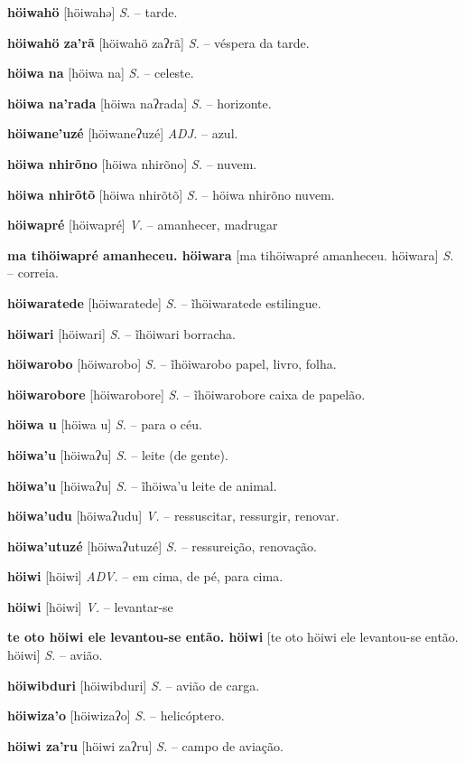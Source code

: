 \textbf{höiwahö} [höiwahə] \textit{S.} -- tarde.

\textbf{höiwahö za'rã} [höiwahö zaʔrã] \textit{S.} -- véspera da tarde.

\textbf{höiwa na} [höiwa na] \textit{S.} -- celeste.

\textbf{höiwa na'rada} [höiwa naʔrada] \textit{S.} -- horizonte.

\textbf{höiwane'uzé} [höiwaneʔuzé] \textit{ADJ.} -- azul.

\textbf{höiwa nhirõno} [höiwa nhirõno] \textit{S.} -- nuvem.

\textbf{höiwa nhirõtõ} [höiwa nhirõtõ] \textit{S.} -- höiwa nhirõno nuvem.

\textbf{höiwapré} [höiwapré] \textit{V.} -- amanhecer, madrugar

\textbf{ma tihöiwapré amanheceu. höiwara} [ma tihöiwapré amanheceu. höiwara] \textit{S.} -- correia.

\textbf{höiwaratede} [höiwaratede] \textit{S.} -- ĩhöiwaratede estilingue.

\textbf{höiwari} [höiwari] \textit{S.} -- ĩhöiwari borracha.

\textbf{höiwarobo} [höiwarobo] \textit{S.} -- ĩhöiwarobo papel, livro, folha.

\textbf{höiwarobore} [höiwarobore] \textit{S.} -- ĩhöiwarobore caixa de papelão.

\textbf{höiwa u} [höiwa u] \textit{S.} -- para o céu.

\textbf{höiwa'u} [höiwaʔu] \textit{S.} -- leite (de gente).

\textbf{höiwa'u} [höiwaʔu] \textit{S.} -- ĩhöiwa'u leite de animal.

\textbf{höiwa'udu} [höiwaʔudu] \textit{V.} -- ressuscitar, ressurgir, renovar.

\textbf{höiwa'utuzé} [höiwaʔutuzé] \textit{S.} -- ressureição, renovação.

\textbf{höiwi} [höiwi] \textit{ADV.} -- em cima, de pé, para cima.

\textbf{höiwi} [höiwi] \textit{V.} -- levantar-se

\textbf{te oto höiwi ele levantou-se então. höiwi} [te oto höiwi ele levantou-se então. höiwi] \textit{S.} -- avião.

\textbf{höiwibduri} [höiwibduri] \textit{S.} -- avião de carga.

\textbf{höiwiza'o} [höiwizaʔo] \textit{S.} -- helicóptero.

\textbf{höiwi za'ru} [höiwi zaʔru] \textit{S.} -- campo de aviação.

